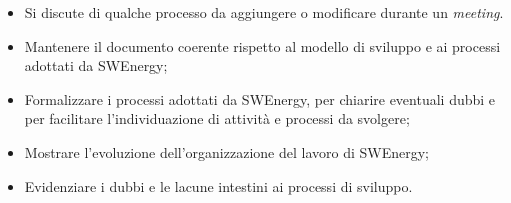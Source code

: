 \label{aggiornare-ndp}

\begin{itemize}
	\item Si discute di qualche processo da aggiungere o modificare durante un
	      \textit{meeting}.
\end{itemize}

\begin{itemize}
	\item Mantenere il documento coerente rispetto al modello di sviluppo e ai
	      processi adottati da SWEnergy;

	\item Formalizzare i processi adottati da SWEnergy, per chiarire eventuali
	      dubbi e per facilitare l'individuazione di attività e processi da
	      svolgere;

	\item Mostrare l'evoluzione dell'organizzazione del lavoro di SWEnergy;

	\item Evidenziare i dubbi e le lacune intestini ai processi di sviluppo.
\end{itemize}

